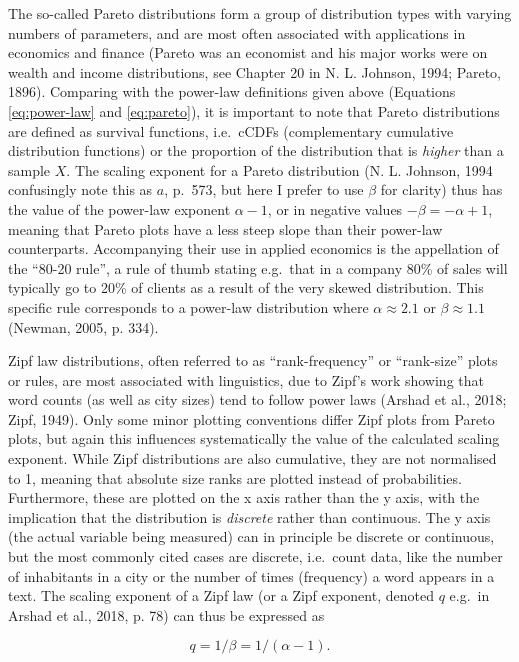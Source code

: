 \documentclass[
  12pt,
]{book}
\begin{document}
The so-called Pareto distributions form a group of distribution types with varying numbers of parameters, and are most often associated with applications in economics and finance (Pareto was an economist and his major works were on wealth and income distributions, see Chapter 20 in N. L. Johnson, 1994; Pareto, 1896). Comparing with the power-law definitions given above (Equations \eqref{eq:power-law} and \eqref{eq:pareto}), it is important to note that Pareto distributions are defined as survival functions, i.e.~cCDFs (complementary cumulative distribution functions) or the proportion of the distribution that is \emph{higher} than a sample \(X\). The scaling exponent for a Pareto distribution (N. L. Johnson, 1994 confusingly note this as \(a\), p.~573, but here I prefer to use \(\beta\) for clarity) thus has the value of the power-law exponent \(\alpha-1\), or in negative values \(-\beta = -\alpha +1\), meaning that Pareto plots have a less steep slope than their power-law counterparts. Accompanying their use in applied economics is the appellation of the ``80-20 rule'', a rule of thumb stating e.g.~that in a company 80\% of sales will typically go to 20\% of clients as a result of the very skewed distribution. This specific rule corresponds to a power-law distribution where \(\alpha \approx 2.1\) or \(\beta \approx 1.1\) (Newman, 2005, p. 334).

Zipf law distributions, often referred to as ``rank-frequency'' or ``rank-size'' plots or rules, are most associated with linguistics, due to Zipf's work showing that word counts (as well as city sizes) tend to follow power laws (Arshad et al., 2018; Zipf, 1949). Only some minor plotting conventions differ Zipf plots from Pareto plots, but again this influences systematically the value of the calculated scaling exponent. While Zipf distributions are also cumulative, they are not normalised to 1, meaning that absolute size ranks are plotted instead of probabilities. Furthermore, these are plotted on the x axis rather than the y axis, with the implication that the distribution is \emph{discrete} rather than continuous. The y axis (the actual variable being measured) can in principle be discrete or continuous, but the most commonly cited cases are discrete, i.e.~count data, like the number of inhabitants in a city or the number of times (frequency) a word appears in a text. The scaling exponent of a Zipf law (or a Zipf exponent, denoted \(q\) e.g.~in Arshad et al., 2018, p. 78) can thus be expressed as

\begin{equation}
q = 1/\beta = 1/(\alpha-1).
\label{eq:zipf-exponent}
\end{equation}
\end{document}
